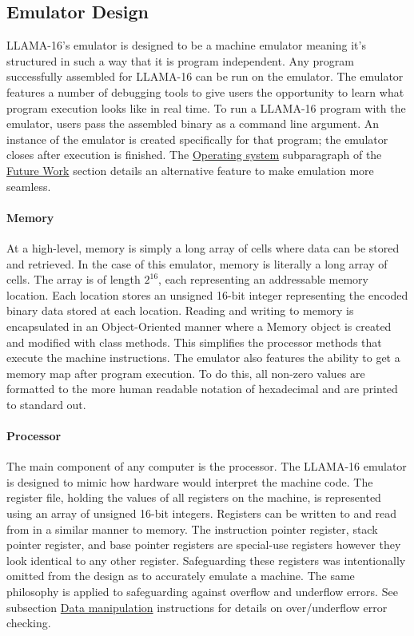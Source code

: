 \documentclass[man,hidelinks,floatsintext]{apa7}
\begin{document}
\subsection{Emulator Design}
LLAMA-16's emulator is designed to be a machine emulator meaning it's structured in such a way that it is program independent. Any program successfully assembled for LLAMA-16 can be run on the emulator. The emulator features a number of debugging tools to give users the opportunity to learn what program execution looks like in real time. To run a LLAMA-16 program with the emulator, users pass the assembled binary as a command line argument. An instance of the emulator is created specifically for that program; the emulator closes after execution is finished. The \hyperref[sec:os]{Operating system} subparagraph of the \hyperref[sec:futurework]{Future Work} section details an alternative feature to make emulation more seamless.
\paragraph{Memory}
At a high-level, memory is simply a long array of cells where data can be stored and retrieved. In the case of this emulator, memory is literally a long array of cells. The array is of length $2^{16}$, each representing an addressable memory location. Each location stores an unsigned 16-bit integer representing the encoded binary data stored at each location. Reading and writing to memory is encapsulated in an Object-Oriented manner where a Memory object is created and modified with class methods. This simplifies the processor methods that execute the machine instructions. The emulator also features the ability to get a memory map after program execution. To do this, all non-zero values are formatted to the more human readable notation of hexadecimal and are printed to standard out.
\paragraph{Processor}
The main component of any computer is the processor. The LLAMA-16 emulator is designed to mimic how hardware would interpret the machine code. The register file, holding the values of all registers on the machine, is represented using an array of unsigned 16-bit integers. Registers can be written to and read from in a similar manner to memory. The instruction pointer register, stack pointer register, and base pointer registers are special-use registers however they look identical to any other register. Safeguarding these registers was intentionally omitted from the design as to accurately emulate a machine. The same philosophy is applied to safeguarding against overflow and underflow errors. See subsection \hyperref[sec:dataman]{Data manipulation} instructions for details on over/underflow error checking.
\end{document}
